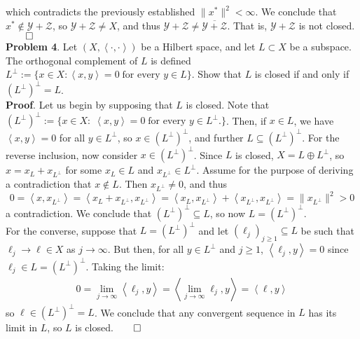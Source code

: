 \documentclass[10pt]{article}
\newcommand{\1}[1]{\mathbbm{1}_{#1}} \newcommand{\mc}[1]{\mathcal{#1}}
\newcommand{\ip}[2]{\left\langle#1,#2\right\rangle }
\begin{document}
    which contradicts the previously established $\|x^\ast\|^2<\infty$. We conclude that $x^\ast\notin\mc{Y}+\mc{Z}$, so $\mc{Y}+\mc{Z}\neq X$, and thus $\mc{Y}+\mc{Z}\neq \overline{\mc{Y}+\mc{Z}}$. That is, $\mc{Y}+\mc{Z}$ is not closed.\hfill{$\qed$}\\[5pt]
    {\bf Problem 4}. Let $(X,\ip{\cdot}{\cdot})$ be a Hilbert space, and let $L\subset X$ be a subspace. The orthogonal complement of $L$ is defined $L^\perp:=\{x\in X:\ip{x}{y}=0\;\text{for every $y\in L$}\}$. Show that $L$ is closed if and only if $(L^\perp)^\perp=L$.\\[5pt]
    {\bf Proof}. Let us begin by supposing that $L$ is closed. Note that $(L^\perp)^\perp:=\{x\in X:\;\ip{x}{y}=0\;\text{for every $y\in L^\perp$.}\}$. Then, if $x\in L$, we have $\ip{x}{y}=0$ for all $y\in L^\perp$, so $x\in (L^\perp)^\perp$, and further $L\subseteq (L^\perp)^\perp$.
    For the reverse inclusion, now consider $x\in (L^\perp)^\perp$. Since $L$ is closed, $X=L\oplus L^\perp$, so $x=x_L+x_{L^\perp}$ for some $x_L\in L$ and $x_{L^\perp}\in L^\perp$. Assume for the purpose of deriving a contradiction that $x\notin L$. Then $x_{L^\perp}\neq 0$, 
    and thus
    \[0=\ip{x}{x_{L^\perp}}=\ip{x_L+x_{L^\perp}}{x_{L^\perp}}=\ip{x_L}{x_{L^\perp}}+\ip{x_{L^\perp}}{x_{L^\perp}}=\|x_{L^\perp}\|^2>0\]
    a contradiction. We conclude that $(L^\perp)^\perp\subseteq L$, so now $L=(L^\perp)^\perp$.\\[5pt]
    For the converse, suppose that $L=(L^\perp)^\perp$ and let $(\ell_j)_{j\geq 1}\subseteq L$ be such that $\ell_j\rightarrow\ell\in X$ as $j\rightarrow\infty$. But then, for all $y\in L^\perp$ and $j\geq 1$, $\ip{\ell_j}{y}=0$ since $\ell_j\in L=(L^\perp)^\perp$. Taking the limit:
    \begin{align*}
        0=\lim_{j\rightarrow\infty}\ip{\ell_j}{y}=\ip{\lim_{j\rightarrow\infty}\ell_j}{y}=\ip{\ell}{y}
    \end{align*}
    so $\ell\in (L^\perp)^\perp=L$. We conclude that any convergent sequence in $L$ has its limit in $L$, so $L$ is closed.\hfill{$\qed$} 
    
\end{document}

